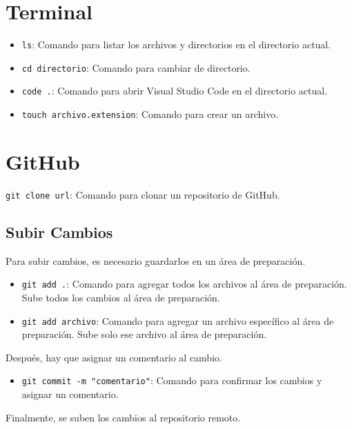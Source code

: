 \documentclass{article} %
\begin{document}
\newpage

\section{Terminal}

\begin{itemize}
    \item \texttt{ls}: Comando para listar los archivos y directorios en el directorio actual.
    \item \texttt{cd directorio}: Comando para cambiar de directorio.
    \item \texttt{code .}: Comando para abrir Visual Studio Code en el directorio actual.
    \item \texttt{touch archivo.extension}: Comando para crear un archivo.
\end{itemize}

\section{GitHub}

\texttt{git clone url}: Comando para clonar un repositorio de GitHub.

\subsection{Subir Cambios}

Para subir cambios, es necesario guardarlos en un área de preparación.

\begin{itemize}
    \item \texttt{git add .}: Comando para agregar todos los archivos al área de preparación. Sube todos los cambios al área de preparación.
    \item \texttt{git add archivo}: Comando para agregar un archivo específico al área de preparación. Sube solo ese archivo al área de preparación.
\end{itemize}

Después, hay que asignar un comentario al cambio.

\begin{itemize}
    \item \texttt{git commit -m "comentario"}: Comando para confirmar los cambios y asignar un comentario.
\end{itemize}

Finalmente, se suben los cambios al repositorio remoto.
\end{document}
